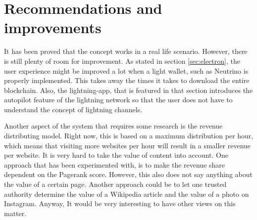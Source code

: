  

\section{Recommendations and improvements}
It has been proved that the concept works in a real life scenario. However, there is still plenty of room for improvement. As stated in section \ref{sec:electron}, the user experience might be improved a lot when a light wallet, such as Neutrino is properly implemented. This takes away the times it takes to download the entire blockchain. Also, the lightning-app, that is featured in that section introduces the autopilot feature of the lightning network so that the user does not have to understand the concept of lightning channels. 

Another aspect of the system that requires some research is the revenue distributing model. Right now, this is based on a maximum distribution per hour, which means that visiting more websites per hour will result in a smaller revenue per website. It is very hard to take the value of content into account. One approach that has been experimented with, is to make the revenue share dependent on the Pagerank score. However, this also does not say anything about the value of a certain page. Another approach could be to let one trusted authority determine the value of a Wikipedia article and the value of a photo on Instagram. Anyway, It would be very interesting to have other views on this matter. 